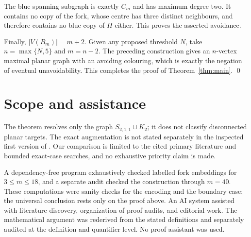 \documentclass[10pt]{article}
\begin{document}
The blue spanning subgraph is exactly $C_m$ and has maximum degree two.  It
contains no copy of the fork, whose centre has three distinct neighbours, and
therefore contains no blue copy of $H$ either.  This proves the asserted
avoidance.

Finally, $|V(B_m)|=m+2$.  Given any proposed threshold $N$, take
$n=\max\{N,5\}$ and $m=n-2$.  The preceding construction gives an
$n$-vertex maximal planar graph with an avoiding colouring, which is exactly
the negation of eventual unavoidability.  This completes the proof of
Theorem~\ref{thm:main}. \qed

\section{Scope and assistance}

The theorem resolves only the graph $S_{2,1,1}\sqcup K_2$; it does not
classify disconnected planar targets.  The exact augmentation is not stated
separately in the inspected first version of
\cite{BaldacchinoCaroMifsud2026}.  Our comparison is limited to the cited
primary literature and bounded exact-case searches, and no exhaustive
priority claim is made.

A dependency-free program exhaustively checked labelled fork embeddings for
$3\leq m\leq18$, and a separate audit checked the construction through
$m=40$.  These computations were sanity checks for the encoding and the
boundary case; the universal conclusion rests only on the proof above.  An
AI system assisted with literature discovery, organization of proof audits,
and editorial work.  The mathematical argument was rederived from the stated
definitions and separately audited at the definition and quantifier level.
No proof assistant was used.



\end{document}
